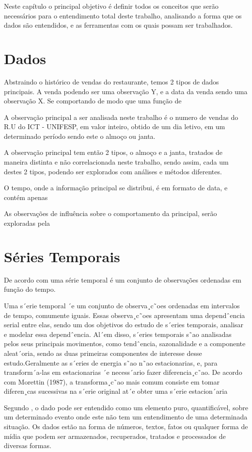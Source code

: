 \documentclass[	12pt, Times, openright, twoside, a4paper, english, brazil]{abntex2}
\begin{document}
Neste capítulo o principal objetivo é definir todos os conceitos que serão necessários para o entendimento total deste trabalho, analisando a forma que os dados são entendidos, e as ferramentas com os quais possam ser trabalhados.

\section{Dados}
Abstraindo o histórico de vendas do restaurante, temos 2 tipos de dados principais. A venda podendo ser uma observação Y, e a data da venda sendo uma observação X. Se comportando de modo que uma função de 

A observação principal a ser analisada neste trabalho é o numero de vendas do R.U do ICT - UNIFESP, em valor inteiro, obtido de um dia letivo, em um determinado período sendo este o almoço ou janta.

A observação principal tem então 2 tipos, o almoço e a janta, tratados de maneira distinta e não correlacionada neste trabalho, sendo assim, cada um destes 2 tipos, podendo ser explorados com análises e métodos diferentes.

O tempo, onde a informação principal se distribui, é em formato de data, e contém apenas

As observações de influência sobre o comportamento da principal, serão exploradas pela 

\section{Séries Temporais}
De acordo com  \cite{Morettin1987} uma série temporal é um conjunto de observações ordenadas em função do tempo.

Uma s´erie temporal ´e um conjunto de observa¸c˜oes ordenadas em intervalos de tempo, comumente
iguais. Essas observa¸c˜oes apresentam uma dependˆencia serial entre elas, sendo um dos objetivos
do estudo de s´eries temporais, analisar e modelar essa dependˆencia. Al´em disso, s´eries temporais
s˜ao analisadas pelos seus principais movimentos, como tendˆencia, sazonalidade e a componente
aleat´oria, sendo as duas primeiras componentes de interesse desse estudo.Geralmente as s´eries
de energia s˜ao n˜ao estacionarias, e, para transform´a-las em estacionarias ´e necess´ario fazer
diferencia¸c˜ao. De acordo com Morettin (1987), a transforma¸c˜ao mais comum consiste em tomar
diferen¸cas sucessivas na s´erie original at´e obter uma s´erie estacion´aria

Segundo \cite{Rezende2003}, o dado pode ser entendido como um elemento puro, quantificável, sobre um determinado evento onde este não tem um entendimento de uma determinada situação. Os dados estão na forma de números, textos, fatos ou qualquer forma de mídia que podem ser armazenados, recuperados, tratados e processados de diversas formas.
\end{document}

